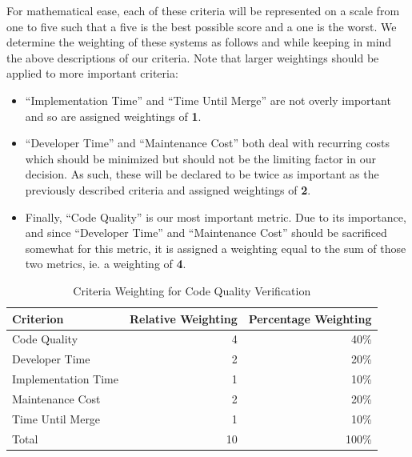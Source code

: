 \documentclass[12pt]{article}
\begin{document}
For mathematical ease, each of these criteria will be represented on a scale from one to five such that a five is the best possible score and a one is the worst. We determine the weighting of these systems as follows and while keeping in mind the above descriptions of our criteria. Note that larger weightings should be applied to more important criteria:
\begin{itemize}
\item ``Implementation Time'' and ``Time Until Merge'' are not overly important and so are assigned weightings of {\bf 1}.
\item ``Developer Time'' and ``Maintenance Cost'' both deal with recurring costs which should be minimized but should not be the limiting factor in our decision. As such, these will be declared to be twice as important as the previously described criteria and assigned weightings of {\bf 2}.
\item Finally, ``Code Quality'' is our most important metric. Due to its importance, and since ``Developer Time'' and ``Maintenance Cost'' should be sacrificed somewhat for this metric, it is assigned a weighting equal to the sum of those two metrics, ie. a weighting of {\bf 4}.
\end{itemize}

\begin{table}[ht]
\caption{Criteria Weighting for Code Quality Verification}
\label{tbl:weighting-cqv}
\centering
\begin{tabular}{|l|r|r|}
    \hline
    Criterion & Relative Weighting & Percentage Weighting \\
    \hline
    \hline
    Code Quality        &  4 &  40\% \\
    Developer Time      &  2 &  20\% \\
    Implementation Time &  1 &  10\% \\
    Maintenance Cost    &  2 &  20\% \\
    Time Until Merge    &  1 &  10\% \\
    \hline
    \hline
    Total               & 10 & 100\% \\
    \hline
\end{tabular}
\end{table}
\end{document}
